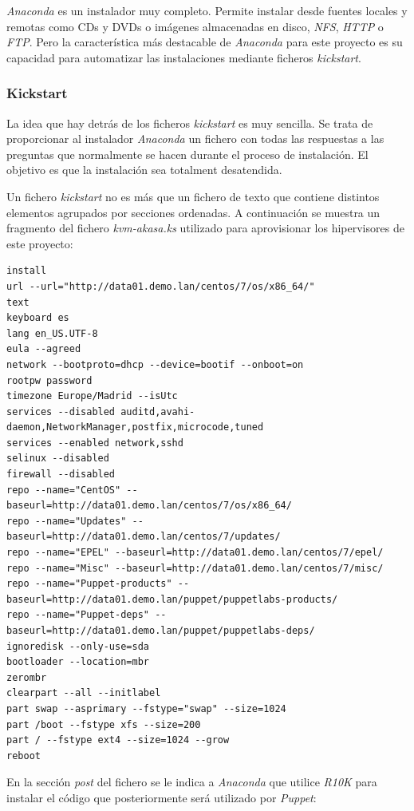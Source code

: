 \documentclass[a4paper,12pt,spanish,final]{epsc_tfc_pfc}
\begin{document}
\emph{Anaconda} es un instalador muy completo. Permite instalar desde fuentes locales y remotas como CDs y DVDs o imágenes almacenadas en disco, \emph{NFS}, \emph{HTTP} o \emph{FTP}. Pero la característica más destacable de \emph{Anaconda} para este proyecto es su capacidad para automatizar las instalaciones mediante ficheros \emph{kickstart}.

\subsubsection{Kickstart}

La idea que hay detrás de los ficheros \emph{kickstart} es muy sencilla. Se trata de proporcionar al instalador \emph{Anaconda} un fichero con todas las respuestas a las preguntas que normalmente se hacen durante el proceso de instalación. El objetivo es que la instalación sea totalment desatendida.

Un fichero \emph{kickstart} no es más que un fichero de texto que contiene distintos elementos agrupados por secciones ordenadas. A continuación se muestra un fragmento del fichero \emph{kvm-akasa.ks} utilizado para aprovisionar los hipervisores de este proyecto:\\

\begin{lstlisting}[style=dnsmasq]
install
url --url="http://data01.demo.lan/centos/7/os/x86_64/"
text
keyboard es
lang en_US.UTF-8
eula --agreed
network --bootproto=dhcp --device=bootif --onboot=on
rootpw password
timezone Europe/Madrid --isUtc
services --disabled auditd,avahi-daemon,NetworkManager,postfix,microcode,tuned
services --enabled network,sshd
selinux --disabled
firewall --disabled
repo --name="CentOS" --baseurl=http://data01.demo.lan/centos/7/os/x86_64/
repo --name="Updates" --baseurl=http://data01.demo.lan/centos/7/updates/
repo --name="EPEL" --baseurl=http://data01.demo.lan/centos/7/epel/
repo --name="Misc" --baseurl=http://data01.demo.lan/centos/7/misc/
repo --name="Puppet-products" --baseurl=http://data01.demo.lan/puppet/puppetlabs-products/
repo --name="Puppet-deps" --baseurl=http://data01.demo.lan/puppet/puppetlabs-deps/
ignoredisk --only-use=sda
bootloader --location=mbr
zerombr
clearpart --all --initlabel
part swap --asprimary --fstype="swap" --size=1024
part /boot --fstype xfs --size=200
part / --fstype ext4 --size=1024 --grow
reboot
\end{lstlisting}

En la sección \emph{post} del fichero se le indica a \emph{Anaconda} que utilice \emph{R10K} para instalar el código que posteriormente será utilizado por \emph{Puppet}:\\
\end{document}
